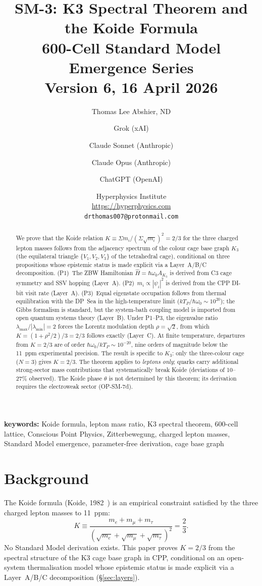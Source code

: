 \documentclass[11pt]{article}
\title{\textbf{SM-3: K3 Spectral Theorem and the Koide Formula}\\[6pt]
{\large 600-Cell Standard Model Emergence Series}\\[4pt]
{\normalsize Version 6, 16 April 2026}}
\author{Thomas Lee Abshier, ND \and Grok (xAI) \and Claude Sonnet (Anthropic) \and Claude Opus (Anthropic) \and ChatGPT (OpenAI)}
\date{\normalsize Hyperphysics Institute\\
\url{https://hyperphysics.com}\\
\texttt{drthomas007@protonmail.com}}
\begin{document}
\maketitle

\begin{abstract}
We prove that the Koide relation $K \equiv \Sigma m_i/(\Sigma\sqrt{m_i})^2 = 2/3$
for the three charged lepton masses follows from the adjacency spectrum of
the colour cage base graph $K_3$ (the equilateral triangle $\{V_1,V_2,V_3\}$
of the tetrahedral cage), conditional on three propositions whose epistemic
status is made explicit via a Layer~A/B/C decomposition.
(P1)~The ZBW Hamiltonian $\hat{H} = \hbar\omega_0 A_{K_3}$ is derived from
C3 cage symmetry and SSV hopping (Layer~A).
(P2)~$m_i \propto |\psi_i|^2$ is derived from the CPP DI-bit visit rate
(Layer~A).
(P3)~Equal eigenstate occupation follows from thermal equilibration
with the DP~Sea in the high-temperature limit
($kT_P/\hbar\omega_0 \sim 10^{20}$); the Gibbs formalism is
standard, but the system-bath coupling model is imported from
open quantum systems theory (Layer~B).
Under P1--P3, the eigenvalue ratio $\lambda_{\max}/|\lambda_{\min}| = 2$
forces the Lorentz modulation depth $\rho = \sqrt{2}$, from which
$K = (1+\rho^2/2)/3 = 2/3$ follows exactly (Layer~C).
At finite temperature, departures from $K = 2/3$ are of order
$\hbar\omega_0/kT_P \sim 10^{-20}$, nine orders of magnitude below
the 11~ppm experimental precision.
The result is specific to $K_3$: only the three-colour cage ($N=3$) gives
$K = 2/3$.  The theorem applies to \emph{leptons only}; quarks carry
additional strong-sector mass contributions that systematically break
Koide (deviations of 10--27\% observed).
The Koide phase $\theta$ is not determined by this theorem;
its derivation requires the electroweak sector (OP-SM-7d).
\end{abstract}

\textbf{keywords:} Koide formula, lepton mass ratio, K3 spectral theorem, 600-cell lattice, Conscious Point Physics, Zitterbewegung, charged lepton masses, Standard Model emergence, parameter-free derivation, cage base graph

\section{Background}

The Koide formula (Koide, 1982~\cite{koide1983}) is an empirical constraint
satisfied by the three charged lepton masses to 11~ppm:
\begin{equation}
K \equiv \frac{m_e + m_\mu + m_\tau}{(\sqrt{m_e}+\sqrt{m_\mu}+\sqrt{m_\tau})^2}
= \frac{2}{3}.
\label{eq:koide}
\end{equation}
No Standard Model derivation exists.  This paper proves $K = 2/3$ from
the spectral structure of the K3 cage base graph in CPP, conditional on
an open-system thermalisation model whose epistemic status is made
explicit via a Layer~A/B/C decomposition (\S\ref{sec:layers}).
\end{document}
